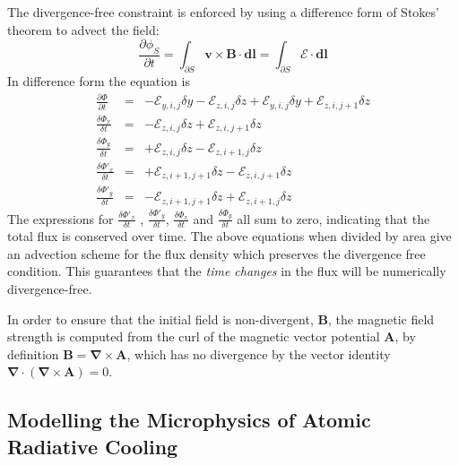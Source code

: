 The divergence-free constraint is enforced by using a difference form of Stokes' theorem to advect the field:
\begin{equation}
\frac{\partial \phi_S}{\partial t}= 
\int_{\partial S}  \mathbf{v} \times \mathbf{B} \cdot \mathbf{dl}
=\int_{\partial S}  \mathcal{E} \cdot \mathbf{dl}
\end{equation}
In difference form the equation is
\begin{eqnarray}
   \frac{\partial \Phi}{\partial t} &=&
	  - \mathcal{E}_{y,i,j} \delta y
	    - \mathcal{E}_{z,i,j} \delta z
		   + \mathcal{E}_{y,i,j} \delta y
			  + \mathcal{E}_{z,i,j+1} \delta z \\
   \frac{\delta \Phi_x}{\delta t} &=&
	  - \mathcal{E}_{z,i,j} \delta z
	    + \mathcal{E}_{z,i,j+1} \delta z \\
\frac{\delta \Phi_y}{\delta t} &=&
	+ \mathcal{E}_{z,i,j} \delta z
	- \mathcal{E}_{z,i+1,j} \delta z \\
   \frac{\delta \Phi'_x}{\delta t} &=&
  + \mathcal{E}_{z,i+1,j+1} \delta z
  - \mathcal{E}_{z,i,j+1} \delta z \\
   \frac{\delta \Phi'_y}{\delta t} &=&
  - \mathcal{E}_{z,i+1,j+1} \delta z
  + \mathcal{E}_{z,i+1,j} \delta z
\end{eqnarray}
The expressions for $\frac{\delta \Phi'_x}{\delta t}$ , $  \frac{\delta \Phi'_y}{\delta t}$, 
$ \frac{\delta \Phi_x}{\delta t} $
and $ \frac{\delta \Phi_y}{\delta t}$  all
sum to zero, indicating that the total flux is conserved over time.
The above equations when divided by area give an advection scheme for the flux density which preserves the divergence free condition.
This guarantees that the \emph{time changes} in the flux will be numerically divergence-free.

In order to ensure that the initial field is non-divergent, $\mathbf{B}$, the magnetic field strength is computed from the curl of the magnetic vector potential $\mathbf{A}$, by definition $\mathbf{B} = \mathbf{\boldsymbol{\nabla}} \times \mathbf{A}$, which has no divergence by the vector identity $ \boldsymbol{\nabla} \cdot (\boldsymbol{\nabla} \times \mathbf{A}) = 0$.


\subsection{Modelling the Microphysics of Atomic Radiative Cooling}
\label{ModellingtheMicrophysicsofAtomicRadiativeCooling}

